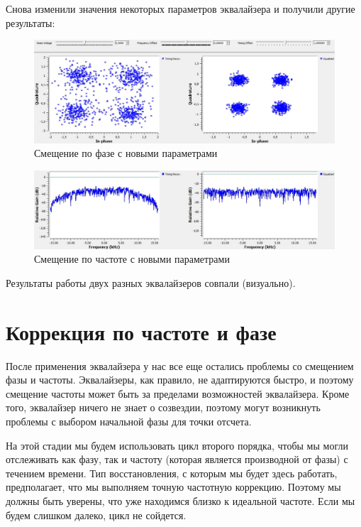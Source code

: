 \documentclass[a4paper, 12pt]{report}
\begin{document}
	Снова изменили значения некоторых параметров эквалайзера и получили другие результаты:
	\begin{figure}[H]
		\centering
		\includegraphics[width=1.0\textwidth]{35.jpg}
		\caption{Смещение по фазе с новыми параметрами}
		\label{fig:35}
	\end{figure}
	\begin{figure}[H]
		\centering
		\includegraphics[width=1.0\textwidth]{36.jpg}
		\caption{Смещение по частоте с новыми параметрами}
		\label{fig:36}
	\end{figure}
	Результаты работы двух разных эквалайзеров совпали (визуально).
	
	\chapter{Коррекция по частоте и фазе}
	После применения эквалайзера у нас все еще остались проблемы со смещением фазы и частоты. Эквалайзеры, как правило, не адаптируются быстро, и поэтому смещение частоты может быть за пределами возможностей эквалайзера. Кроме того,  эквалайзер ничего не знает о созвездии, поэтому могут возникнуть проблемы с выбором начальной фазы для точки отсчета.

	На этой стадии мы будем использовать цикл второго порядка, чтобы мы могли отслеживать как фазу, так и частоту (которая является производной от фазы) с течением времени. Тип восстановления, с которым мы будет здесь работать, предполагает, что мы выполняем точную частотную коррекцию. Поэтому мы должны быть уверены, что уже находимся близко к идеальной частоте. Если мы будем слишком далеко,  цикл не сойдется. 
\end{document}

